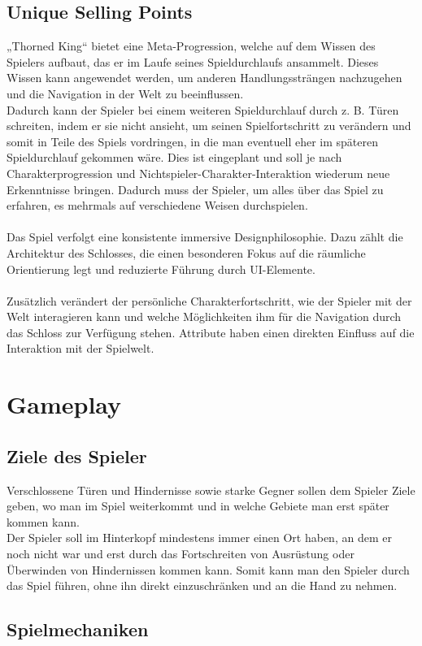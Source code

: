 \documentclass[envcountsame,envcountchap deutsch]{i-studis}
\begin{document}
\section{Unique Selling Points}
„Thorned King“ bietet eine Meta-Progression, welche auf dem Wissen des Spielers aufbaut, das er im Laufe
seines Spieldurchlaufs ansammelt. Dieses Wissen kann angewendet werden, um anderen
Handlungssträngen nachzugehen und die Navigation in der Welt zu beeinflussen. 
\\
Dadurch kann der Spieler bei einem weiteren Spieldurchlauf durch z. B. Türen schreiten, indem er sie nicht
ansieht, um seinen Spielfortschritt zu verändern und somit in Teile des Spiels vordringen, in die man
eventuell eher im späteren Spieldurchlauf gekommen wäre. Dies ist eingeplant und soll je nach
Charakterprogression und Nichtspieler-Charakter-Interaktion wiederum neue Erkenntnisse bringen. Dadurch
muss der Spieler, um alles über das Spiel zu erfahren, es mehrmals auf verschiedene Weisen durchspielen.
\\ \\
Das Spiel verfolgt eine konsistente immersive Designphilosophie. Dazu zählt die Architektur des Schlosses,
die einen besonderen Fokus auf die räumliche Orientierung legt und reduzierte Führung durch UI-Elemente.
\\ \\
Zusätzlich verändert der persönliche Charakterfortschritt, wie der Spieler mit der Welt interagieren kann und
welche Möglichkeiten ihm für die Navigation durch das Schloss zur Verfügung stehen. Attribute haben einen
direkten Einfluss auf die Interaktion mit der Spielwelt.
\chapter{Gameplay}
	\section{Ziele des Spieler}
	Verschlossene Türen und Hindernisse sowie starke Gegner sollen dem Spieler Ziele geben, wo man im Spiel
	weiterkommt und in welche Gebiete man erst später kommen kann. 
	\\Der Spieler soll im Hinterkopf
	mindestens immer einen Ort haben, an dem er noch nicht war und erst durch das Fortschreiten von
	Ausrüstung oder Überwinden von Hindernissen kommen kann. Somit kann man den Spieler durch das Spiel
	führen, ohne ihn direkt einzuschränken und an die Hand zu nehmen.
	\section{Spielmechaniken}
\end{document}
